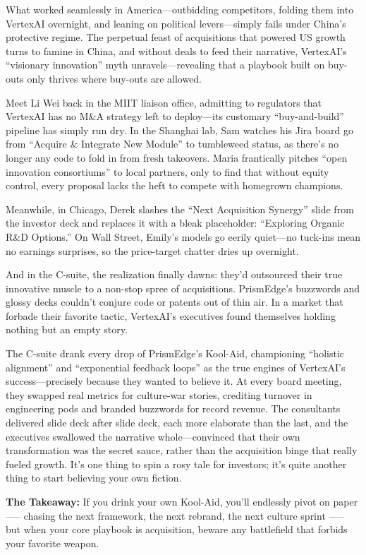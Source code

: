 What worked seamlessly in America—outbidding competitors, folding them into VertexAI overnight, and leaning on 
political levers—simply fails under China’s protective regime. The perpetual feast of acquisitions that powered 
US growth turns to famine in China, and without deals to feed their narrative, VertexAI’s “visionary innovation” 
myth unravels—revealing that a playbook built on buy-outs only thrives where buy-outs are allowed.


Meet Li Wei back in the MIIT liaison office, admitting to regulators that VertexAI has no M\&A strategy left to 
deploy—its customary “buy-and-build” pipeline has simply run dry. In the Shanghai lab, Sam watches his Jira 
board go from “Acquire \& Integrate New Module” to tumbleweed status, as there’s no longer any code to fold in 
from fresh takeovers. Maria frantically pitches “open innovation consortiums” to local partners, only to find 
that without equity control, every proposal lacks the heft to compete with homegrown champions.

Meanwhile, in Chicago, Derek slashes the “Next Acquisition Synergy” slide from the investor deck and replaces 
it with a bleak placeholder: “Exploring Organic R\&D Options.” On Wall Street, Emily’s models go eerily 
quiet—no tuck-ins mean no earnings surprises, so the price-target chatter dries up overnight.

And in the C-suite, the realization finally dawns: they’d outsourced their true innovative muscle to a 
non-stop spree of acquisitions. PrismEdge’s buzzwords and glossy decks couldn’t conjure code or patents out 
of thin air. In a market that forbade their favorite tactic, VertexAI’s executives found themselves holding 
nothing but an empty story.

The C-suite drank every drop of PrismEdge’s Kool-Aid, championing “holistic alignment” and “exponential feedback 
loops” as the true engines of VertexAI’s success—precisely because they wanted to believe it. At every board 
meeting, they swapped real metrics for culture-war stories, crediting turnover in engineering pods and branded 
buzzwords for record revenue. The consultants delivered slide deck after slide deck, each more elaborate than 
the last, and the executives swallowed the narrative whole—convinced that their own transformation was the 
secret sauce, rather than the acquisition binge that really fueled growth. It’s one thing to spin a rosy tale 
for investors; it’s quite another thing to start believing your own fiction.

\textbf{The Takeaway:} If you drink your own Kool-Aid, you’ll endlessly pivot on paper --— chasing the next framework, 
the next rebrand, the next culture sprint —-- but when your core playbook is acquisition, beware any battlefield 
that forbids your favorite weapon.

